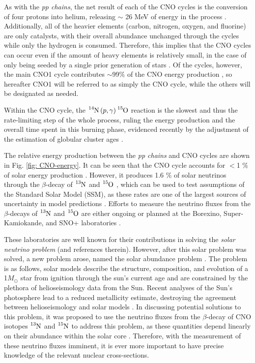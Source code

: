 \noindent As with the \textit{pp chains}, the net result of each of the CNO cycles is the conversion of four protons into helium, releasing $\sim$ 26 MeV of energy in the process \cite{RyanNortonBook}. Additionally, all of the heavier elements (carbon, nitrogen, oxygen, and fluorine) are only catalysts, with their overall abundance unchanged through the cycles while only the hydrogen is consumed. Therefore, this implies that the CNO cycles can occur even if the amount of heavy elements is relatively small, in the case of only being seeded by a single prior generation of stars \cite{IliadisBook}. Of the cycles, however, the main CNO1 cycle contributes $\sim$99$\%$ of the CNO energy production \cite{Adelberger1998}, so hereafter CNO1 will be referred to as simply the CNO cycle, while the others will be designated as needed. 

Within the CNO cycle, the $\ce{^{14}N} \left( p, \gamma \right) \ce{^{15}O}$ reaction is the slowest and thus the rate-limiting step of the whole process, ruling the energy production and the overall time spent in this burning phase, evidenced recently by the adjustment of the estimation of globular cluster ages \cite{Imbriani2004}.

The relative energy production between the \textit{pp chains} and CNO cycles are shown in Fig. \ref{fig: CNO-energy}. It can be seen that the CNO cycle accounts for $< $1 \% of solar energy production \cite{Adelberger1998, Adelberger2011}. However, it produces 1.6 \% of solar neutrinos through the $\beta$-decay of $\ce{^{13}N}$ and $\ce{^{15}O}$ \cite{Bahcall2005a}, which can be used to test assumptions of the Standard Solar Model (SSM), as these rates are one of the largest sources of uncertainty in model predictions \cite{Serenelli2013}. Efforts to measure the neutrino fluxes from the $\beta$-decays of $\ce{^{13}N}$ and $\ce{^{15}O}$ are either ongoing or planned at the Borexino, Super-Kamiokande, and SNO+ laboratories \cite{Jose2011a}.

These laboratories are well known for their contributions in solving the \textsl{solar neutrino problem} \cite{Jose2011a} (and references therein). However, after this solar problem was solved, a new problem arose, named the solar abundance problem \cite{Adelberger2011, Serenelli2009}. The problem is as follows, solar models describe the structure, composition, and evolution of a 1$M_{\odot}$ star from ignition through the sun's current age and are constrained by the plethora of helioseismology data from the Sun. Recent analyses of the Sun's photosphere lead to a reduced metallicity estimate, destroying the agreement between helioseismology and solar models \cite{Asplund2009}. In discussing potential solutions to this problem, it was proposed to use the neutrino fluxes from the $\beta$-decay of CNO isotopes $\ce{^{13}N}$ and $\ce{^{15}N}$ to address this problem, as these quantities depend linearly on their abundance within the solar core \cite{Bahcall2005a, Bahcall2005b}. Therefore, with the measurement of these neutrino fluxes imminent, it is ever more important to have precise knowledge of the relevant nuclear cross-sections.  



